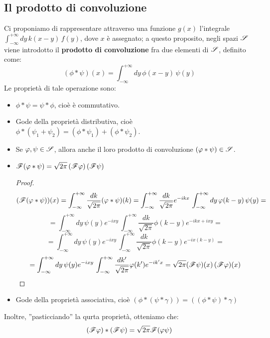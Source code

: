 \subsection{Il prodotto di convoluzione}
Ci proponiamo di rappresentare attraverso una funzione $g(x)$ l'integrale $\int_{-\infty} ^{+\infty} dy \, k(x-y) \, f(y)$, dove $x$ è assegnato; a questo proposito, negli spazi $\S$ viene introdotto il \textbf{prodotto di convoluzione} fra due elementi di $\S$, definito come:
$$\left(\phi \ast \psi \right) (x) = \int_{-\infty} ^{+\infty} dy \, \phi(x-y) \, \psi(y)$$
Le proprietà di tale operazione sono:
\begin{itemize}
\item $\phi \ast \psi = \psi \ast \phi$, cioè è commutativo.
\item Gode della proprietà distributiva, cioè $\phi \ast (\psi_1 + \psi_2)=(\phi \ast \psi_1) + (\phi \ast \psi_2)$.
\item Se $\phi, \psi \in \S$, allora anche il loro prodotto di convoluzione $(\phi \ast \psi) \in \S$.
\item $\F (\phi \ast \psi) = \sqrt{2 \pi} \left(\F \phi \right) \left(\F \psi \right)$
\begin{proof}
$$(\F (\phi \ast \psi))(x)=\int_{-\infty} ^{+\infty} \frac{dk}{\sqrt{2 \pi}} (\phi \ast \psi) (k)= \int_{-\infty} ^{+\infty} \frac{dk}{\sqrt{2 \pi}} e^{-ikx} \, \int_{-\infty} ^{+\infty} dy \, \phi(k-y) \, \psi(y)=$$
$$=\int_{-\infty} ^{+\infty} dy \, \psi(y) e^{-ixy} \, \int_{-\infty} ^{+\infty} \frac{dk}{\sqrt{2 \pi}} \phi(k-y) e^{-ikx +ixy}=$$
$$= \int_{-\infty} ^{+\infty} dy \, \psi(y) e^{-ixy} \, \int_{-\infty} ^{+\infty} \frac{dk}{\sqrt{2 \pi}} \phi(k-y) e^{-ix(k-y)}=$$
$$=\int_{-\infty} ^{+\infty} dy \, \psi(y) e^{-ixy} \, \int_{-\infty} ^{+\infty} \frac{dk'}{\sqrt{2 \pi}} \phi(k') e^{-ik'x} = \sqrt{2 \pi} (\F \psi) (x) \, (\F \phi)(x)$$
\end{proof}
\item Gode della proprietà associativa, cioè $(\phi \ast(\psi \ast \gamma))=((\phi \ast \psi)\ast \gamma)$
\end{itemize}
Inoltre, ''pasticciando'' la qurta proprietà, otteniamo che:
$$(\F \phi) \ast (\F \psi)= \sqrt{2 \pi} \F (\phi \psi)$$
